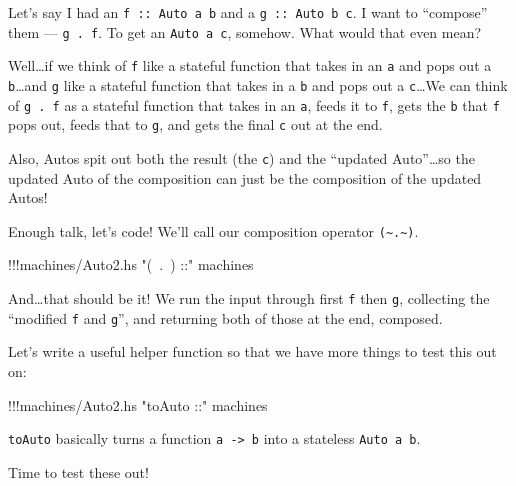 \documentclass[]{article}
\newenvironment{Shaded}{}{}
\newcommand{\StringTok}[1]{\textcolor[rgb]{0.25,0.44,0.63}{{#1}}}
\newcommand{\FunctionTok}[1]{\textcolor[rgb]{0.02,0.16,0.49}{{#1}}}
\newcommand{\NormalTok}[1]{{#1}}
\begin{document}
Let's say I had an \texttt{f\ ::\ Auto\ a\ b} and a
\texttt{g\ ::\ Auto\ b\ c}. I want to ``compose'' them ---
\texttt{g\ .\ f}. To get an \texttt{Auto\ a\ c}, somehow. What would
that even mean?

Well\ldots{}if we think of \texttt{f} like a stateful function that
takes in an \texttt{a} and pops out a \texttt{b}\ldots{}and \texttt{g}
like a stateful function that takes in a \texttt{b} and pops out a
\texttt{c}\ldots{}We can think of \texttt{g\ .\ f} as a stateful
function that takes in an \texttt{a}, feeds it to \texttt{f}, gets the
\texttt{b} that \texttt{f} pops out, feeds that to \texttt{g}, and gets
the final \texttt{c} out at the end.

Also, Autos spit out both the result (the \texttt{c}) and the ``updated
Auto''\ldots{}so the updated Auto of the composition can just be the
composition of the updated Autos!

Enough talk, let's code! We'll call our composition operator
\texttt{(\textasciitilde{}.\textasciitilde{})}.

\begin{Shaded}
\begin{Highlighting}[]
\FunctionTok{!!!}\NormalTok{machines}\FunctionTok{/}\NormalTok{Auto2.hs }\StringTok{"(~.~) ::"} \NormalTok{machines}
\end{Highlighting}
\end{Shaded}

And\ldots{}that should be it! We run the input through first \texttt{f}
then \texttt{g}, collecting the ``modified \texttt{f} and \texttt{g}'',
and returning both of those at the end, composed.

Let's write a useful helper function so that we have more things to test
this out on:

\begin{Shaded}
\begin{Highlighting}[]
\FunctionTok{!!!}\NormalTok{machines}\FunctionTok{/}\NormalTok{Auto2.hs }\StringTok{"toAuto ::"} \NormalTok{machines}
\end{Highlighting}
\end{Shaded}

\texttt{toAuto} basically turns a function
\texttt{a\ -\textgreater{}\ b} into a stateless \texttt{Auto\ a\ b}.

Time to test these out!
\end{document}
